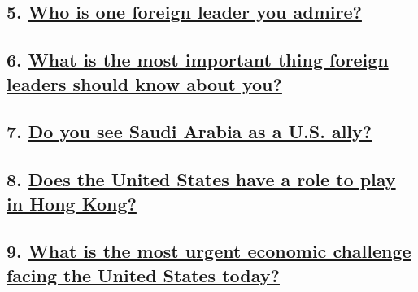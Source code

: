\hypertarget{5-who-is-one-foreign-leader-you-admire}{%
\subsection{\texorpdfstring{5.
\href{https://www.nytimes.com/interactive/2020/us/politics/foreign-leader-20-questions.html}{Who
is one foreign leader you
admire?}}{5. Who is one foreign leader you admire?}}\label{5-who-is-one-foreign-leader-you-admire}}

\hypertarget{6-what-is-the-most-important-thing-foreign-leaders-should-know-about-you}{%
\subsection{\texorpdfstring{6.
\href{https://www.nytimes.com/interactive/2020/us/politics/diplomacy-20-questions.html}{What
is the most important thing foreign leaders should know about
you?}}{6. What is the most important thing foreign leaders should know about you?}}\label{6-what-is-the-most-important-thing-foreign-leaders-should-know-about-you}}

\hypertarget{7-do-you-see-saudi-arabia-as-a-us-ally}{%
\subsection{\texorpdfstring{7.
\href{https://www.nytimes.com/interactive/2020/us/politics/us-allies-saudi-arabia-20-questions.html}{Do
you see Saudi Arabia as a U.S.
ally?}}{7. Do you see Saudi Arabia as a U.S. ally?}}\label{7-do-you-see-saudi-arabia-as-a-us-ally}}

\hypertarget{8-does-the-united-states-have-a-role-to-play-in-hong-kong}{%
\subsection{\texorpdfstring{8.
\href{https://www.nytimes.com/interactive/2020/us/politics/hong-kong-protests-20-questions.html}{Does
the United States have a role to play in Hong
Kong?}}{8. Does the United States have a role to play in Hong Kong?}}\label{8-does-the-united-states-have-a-role-to-play-in-hong-kong}}

\hypertarget{9-what-is-the-most-urgent-economic-challenge-facing-the-united-states-today}{%
\subsection{\texorpdfstring{9.
\href{https://www.nytimes.com/interactive/2020/us/politics/us-economy-20-questions.html}{What
is the most urgent economic challenge facing the United States
today?}}{9. What is the most urgent economic challenge facing the United States today?}}\label{9-what-is-the-most-urgent-economic-challenge-facing-the-united-states-today}}

